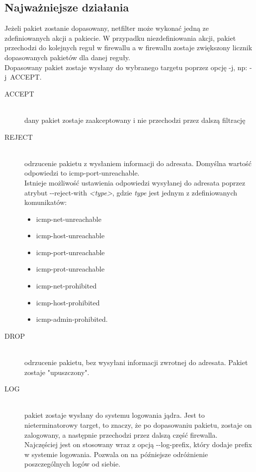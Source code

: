 \documentclass[a4paper,12pt,oneside]{book}
\newcommand{\param}[1]{\textit{\textless #1\textgreater}}
\begin{document}
		\subsection{Najważniejsze działania}
			Jeżeli pakiet zostanie dopasowany, netfilter może wykonać jedną ze zdefiniowanych akcji a pakiecie. W przypadku niezdefiniowania akcji, pakiet przechodzi do kolejnych reguł w firewallu a w firewallu zostaje zwiększony licznik dopasowanych pakietów dla danej reguły.\\
			Dopasowany pakiet zostaje wysłany do wybranego targetu poprzez opcję -j, np: -j~ACCEPT.
			\begin{description}
				\item[ACCEPT] \hfill \\
					dany pakiet zostaje zaakceptowany i nie przechodzi przez dalszą filtrację
				\item[REJECT] \hfill \\
					odrzucenie pakietu z wysłaniem informacji do adresata. Domyślna wartość odpowiedzi to icmp-port-unreachable.\\
					Istnieje możliwość ustawienia odpowiedzi wysyłanej do adresata poprzez atrybut -{}-reject-with \param{type},
					gdzie \textit{type} jest jednym z zdefiniowanych komunikatów:
					\begin{itemize}
						\item icmp-net-unreachable
						\item icmp-host-unreachable
						\item icmp-port-unreachable
						\item icmp-prot-unreachable
						\item icmp-net-prohibited
						\item icmp-host-prohibited
						\item icmp-admin-prohibited.
					\end{itemize}
				\item[DROP] \hfill \\
					odrzucenie pakietu, bez wysyłani informacji zwrotnej do adresata. Pakiet zostaje "upuszczony".
				\item[LOG] \hfill \\
					pakiet zostaje wysłany do systemu logowania jądra. Jest to nieterminatorowy target, to znaczy, że po dopasowaniu pakietu, zostaje on zalogowany, a następnie przechodzi przez dalszą część firewalla.\\
					Najczęściej jest on stosowany wraz z opcją -{}-log-prefix, który dodaje prefix w systemie logowania. Pozwala on na późniejsze odróżnienie poszczególnych logów od siebie.

\end{description}
\end{document}
